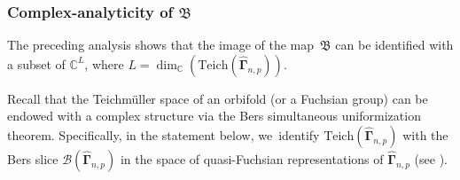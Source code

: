 \documentclass[JEP,XML,SOM,Unicode,NoFloatCountersInSection,published]{cedram}
\theoremstyle{definition}
\theoremstyle{remark}
\newcommand{\C}{\mathbb{C}}
\begin{document}
\subsubsection*{Complex-analyticity of $\mathfrak{B}$}

The preceding analysis shows that the image of the map~$\mathfrak{B}$ can be identified with a subset of $\C^L$, where
$L=\dim_{\C}(\mathrm{Teich}(\widehat{\pmb{\Gamma}}_{n,p})).$

Recall that the Teichmüller space of an orbifold (or a Fuchsian group) can be endowed with a complex structure via the Bers simultaneous uniformization theorem. Specifically, in the statement below, we~identify $\mathrm{Teich}(\widehat{\pmb{\Gamma}}_{n,p})$ with the Bers slice $\mathcal{B}(\widehat{\pmb{\Gamma}}_{n,p})$ in the space of quasi-Fuchsian representations of $\widehat{\pmb{\Gamma}}_{n,p}$ (see \cite[\S 5.10]{Mar16}).
\end{document}
